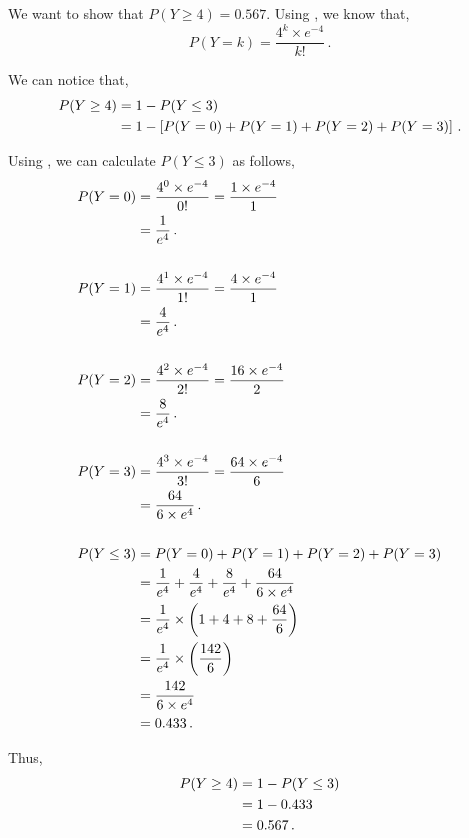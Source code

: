 \begin{subquestions}
\begin{subsubquestions}
We want to show that $P(Y \geq 4) = 0.567$. Using , we know that,
\begin{equation}
	P(Y=k)= \frac{4^k \times e^{-4}}{k!} \,. \label{2013:q4:eq:Pois1}
\end{equation}

We can notice that,
\begin{align}
	P(Y \geq 4) & = 1 - P(Y \leq 3) \nonumber \\
	            & = 1 - \left[P(Y=0)+P(Y=1)+P(Y=2)+P(Y=3) \right] \,.
\end{align}

Using , we can calculate $P(Y \leq 3)$ as follows,
\begin{align}
	P(Y=0) & = \frac{4^0 \times e^{-4}}{0!} 
	         = \frac{1 \times e^{-4}}{1} \nonumber \\
	       & = \frac{1}{e^4} \,. \\	\nonumber \\
	P(Y=1) & = \frac{4^1 \times e^{-4}}{1!} 
	         = \frac{4 \times e^{-4}}{1} \nonumber \\
	       & = \frac{4}{e^4} \,. \\	\nonumber \\       
	P(Y=2) & = \frac{4^2 \times e^{-4}}{2!} 
		     = \frac{16 \times e^{-4}}{2} \nonumber \\
           & = \frac{8}{e^4} \,. \\ \nonumber \\            
	P(Y=3) & = \frac{4^3 \times e^{-4}}{3!} 
             = \frac{64 \times e^{-4}}{6} \nonumber \\
           & = \frac{64}{6 \times e^4} \,. \\ \nonumber \\         
    P(Y \leq 3) & = P(Y=0)+P(Y=1)+P(Y=2)+P(Y=3) \nonumber \\
                & = \frac{1}{e^4} + \frac{4}{e^4} + \frac{8}{e^4} + \frac{64}{6 \times e^4} \nonumber \\
                & = \frac{1}{e^4} \times \left(1+4+8+\frac{64}{6} \right) \nonumber \\
                & = \frac{1}{e^4} \times \left(\frac{142}{6} \right) \nonumber \\
                & = \frac{142}{6 \times e^4} \nonumber \\
                & = 0.433 \,.
\end{align}

Thus,
\begin{align}
	P(Y \geq 4) & = 1 - P(Y \leq 3) \nonumber \\
	            & = 1 - 0.433 \nonumber \\
	            & = 0.567 \,.
\end{align}


\subsubquestion


\end{subsubquestions}





\end{subquestions}

